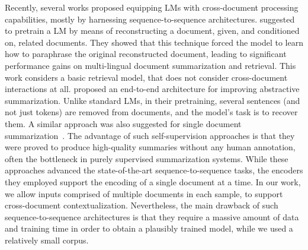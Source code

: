\documentclass[11pt,a4paper]{article}
\begin{document}
Recently, several works proposed equipping LMs with cross-document processing capabilities, mostly by harnessing sequence-to-sequence architectures.
\citet{lewis2020pre} suggested to pretrain a LM by means of reconstructing a document, given, and conditioned on, related documents. 
They showed that this technique forced the model to learn how to paraphrase the original reconstructed document, leading to significant performance gains on multi-lingual document summarization and retrieval. This work considers a basic retrieval model, that does not consider cross-document interactions at all.\citet{Zhang2020PEGASUSPW} proposed an
end-to-end architecture for improving abstractive summarization. Unlike standard LMs, in their pretraining, several sentences (and not just tokens) are removed from documents, and the model's task is to recover them. A similar approach was also suggested for single document summarization~\cite{zhang-etal-2019-hibert}. The advantage of such self-supervision approaches is that they were proved to produce high-quality summaries without any human annotation, often the bottleneck in purely supervised summarization systems. While these approaches advanced the state-of-the-art sequence-to-sequence tasks, the encoders they employed support the encoding of a single document at a time. In our work, we allow inputs comprised of multiple documents in each sample, to support cross-document contextualization. Nevertheless, the main drawback of such sequence-to-sequence architectures is that they require a massive amount of data and training time in order to obtain a plausibly trained model, while we used a relatively small corpus. 
\end{document}
